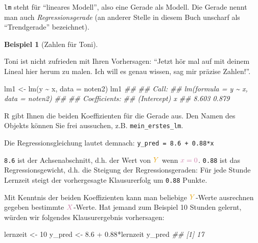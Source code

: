 \documentclass[
  letterpaper,
]{scrbook}
\newenvironment{Shaded}{\begin{snugshade}}{\end{snugshade}}
\newcommand{\AttributeTok}[1]{\textcolor[rgb]{0.40,0.45,0.13}{#1}}
\newcommand{\DecValTok}[1]{\textcolor[rgb]{0.68,0.00,0.00}{#1}}
\newcommand{\DocumentationTok}[1]{\textcolor[rgb]{0.37,0.37,0.37}{\textit{#1}}}
\newcommand{\FloatTok}[1]{\textcolor[rgb]{0.68,0.00,0.00}{#1}}
\newcommand{\FunctionTok}[1]{\textcolor[rgb]{0.28,0.35,0.67}{#1}}
\newcommand{\NormalTok}[1]{\textcolor[rgb]{0.00,0.23,0.31}{#1}}
\newcommand{\OtherTok}[1]{\textcolor[rgb]{0.00,0.23,0.31}{#1}}
\newcommand{\SpecialCharTok}[1]{\textcolor[rgb]{0.37,0.37,0.37}{#1}}
\theoremstyle{definition}
\newtheorem{example}{Beispiel}[chapter]
\theoremstyle{definition}
\theoremstyle{definition}
\theoremstyle{remark}
\begin{document}
\texttt{lm} steht für ``lineares Modell'', also eine Gerade als Modell.
Die Gerade nennt man auch \emph{Regressionsgerade} (an anderer Stelle in
diesem Buch unscharf als ``Trendgerade'' bezeichnet).

\begin{example}[Zahlen für
Toni]\protect\hypertarget{exm-noten5}{}\label{exm-noten5}

Toni ist nicht zufrieden mit Ihren Vorhersagen: ``Jetzt hör mal auf mit
deinem Lineal hier herum zu malen. Ich will es genau wissen, sag mir
präzise Zahlen!''.

\end{example}

\begin{Shaded}
\begin{Highlighting}[]
\NormalTok{lm1 }\OtherTok{\textless{}{-}} \FunctionTok{lm}\NormalTok{(y }\SpecialCharTok{\textasciitilde{}}\NormalTok{ x, }\AttributeTok{data =}\NormalTok{ noten2)}
\NormalTok{lm1}
\DocumentationTok{\#\# }
\DocumentationTok{\#\# Call:}
\DocumentationTok{\#\# lm(formula = y \textasciitilde{} x, data = noten2)}
\DocumentationTok{\#\# }
\DocumentationTok{\#\# Coefficients:}
\DocumentationTok{\#\# (Intercept)            x  }
\DocumentationTok{\#\#       8.603        0.879}
\end{Highlighting}
\end{Shaded}

R gibt Ihnen die beiden Koeffizienten für die Gerade aus. Den Namen des
Objekts können Sie frei aussuchen, z.B. \texttt{mein\_erstes\_lm}.

Die Regressionsgleichung lautet demnach:
\texttt{y\_pred\ =\ 8.6\ +\ 0.88*x}

\texttt{8.6} ist der Achsenabschnitt, d.h. der Wert von
\(\color{ycol}{Y}\) wenn \(\color{xcol}{x}=0\). \texttt{0.88} ist das
Regressionsgewicht, d.h. die Steigung der Regressionsgeraden: Für jede
Stunde Lernzeit steigt der vorhergesagte Klausurerfolg um \texttt{0.88}
Punkte.

Mit Kenntnis der beiden Koeffizienten kann man beliebige
\(\color{ycol}{Y}\)-Werte ausrechnen gegeben bestimmte
\(\color{xcol}{X}\)-Werte. Hat jemand zum Beispiel 10 Stunden gelernt,
würden wir folgendes Klausurergebnis vorhersagen:

\begin{Shaded}
\begin{Highlighting}[]
\NormalTok{lernzeit }\OtherTok{\textless{}{-}} \DecValTok{10}
\NormalTok{y\_pred }\OtherTok{\textless{}{-}} \FloatTok{8.6} \SpecialCharTok{+} \FloatTok{0.88}\SpecialCharTok{*}\NormalTok{lernzeit}
\NormalTok{y\_pred}
\DocumentationTok{\#\# [1] 17}
\end{Highlighting}
\end{Shaded}
\end{document}
